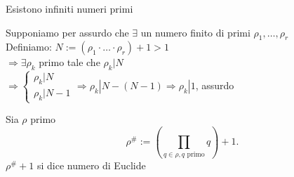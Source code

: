 \documentclass[12px]{article}
\begin{document}
	\begin{teo}[Euclide]
		Esistono infiniti numeri primi
	\end{teo}
	\begin{dimo}
		Supponiamo per assurdo che $\exists$ un numero finito di primi $\rho_1,\ldots, \rho_r$\\
		Definiamo:
		$N:= (\rho_1 \cdot\ldots\cdot\rho_r) + 1 > 1$\\
		$ \Rightarrow\exists \rho_k$ primo tale che $\rho_k | N$\\
		 $ \Rightarrow \begin{cases}
		 	\rho_k|N\\
			\rho_k|N-1
		 \end{cases} \Rightarrow \rho_k|N-(N-1) \Rightarrow \rho_k | 1$, assurdo
	\end{dimo}
	\begin{defi}
		Sia $\rho$ primo
		\[
			\rho^\# := \left(\prod_{q\in\rho, q \text{ primo}} q \right) + 1
		.\] 
		$\rho^\#+1$ si dice numero di Euclide
	\end{defi}
\end{document}

